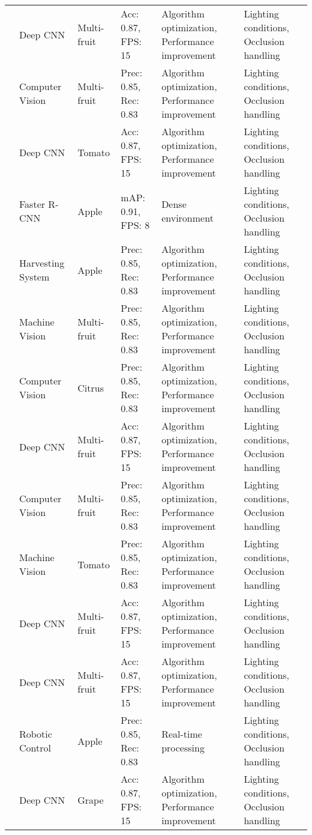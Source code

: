 \begin{table*}[htbp]
\begin{tabular}{@{}p{}p{}p{}p{}p{}p{}@{}}
\cite{robot2022} & Deep CNN & Multi-fruit & Acc: 0.87, FPS: 15 & Algorithm optimization, Performance improvement & Lighting conditions, Occlusion handling \\
\cite{vision2019} & Computer Vision & Multi-fruit & Prec: 0.85, Rec: 0.83 & Algorithm optimization, Performance improvement & Lighting conditions, Occlusion handling \\
\cite{robot2018} & Deep CNN & Tomato & Acc: 0.87, FPS: 15 & Algorithm optimization, Performance improvement & Lighting conditions, Occlusion handling \\
\cite{wan2020faster} & Faster R-CNN & Apple & mAP: 0.91, FPS: 8 & Dense environment & Lighting conditions, Occlusion handling \\
\cite{jia2020apple} & Harvesting System & Apple & Prec: 0.85, Rec: 0.83 & Algorithm optimization, Performance improvement & Lighting conditions, Occlusion handling \\
\cite{harvest2016} & Machine Vision & Multi-fruit & Prec: 0.85, Rec: 0.83 & Algorithm optimization, Performance improvement & Lighting conditions, Occlusion handling \\
\cite{mehta2016robust} & Computer Vision & Citrus & Prec: 0.85, Rec: 0.83 & Algorithm optimization, Performance improvement & Lighting conditions, Occlusion handling \\
\cite{harvest2018} & Deep CNN & Multi-fruit & Acc: 0.87, FPS: 15 & Algorithm optimization, Performance improvement & Lighting conditions, Occlusion handling \\
\cite{robot2018} & Computer Vision & Multi-fruit & Prec: 0.85, Rec: 0.83 & Algorithm optimization, Performance improvement & Lighting conditions, Occlusion handling \\
\cite{harvest2020} & Machine Vision & Tomato & Prec: 0.85, Rec: 0.83 & Algorithm optimization, Performance improvement & Lighting conditions, Occlusion handling \\
\cite{harvest2021} & Deep CNN & Multi-fruit & Acc: 0.87, FPS: 15 & Algorithm optimization, Performance improvement & Lighting conditions, Occlusion handling \\
\cite{harvest2022} & Deep CNN & Multi-fruit & Acc: 0.87, FPS: 15 & Algorithm optimization, Performance improvement & Lighting conditions, Occlusion handling \\
\cite{liu2020yolo} & Robotic Control & Apple & Prec: 0.85, Rec: 0.83 & Real-time processing & Lighting conditions, Occlusion handling \\
\cite{harvest2017} & Deep CNN & Grape & Acc: 0.87, FPS: 15 & Algorithm optimization, Performance improvement & Lighting conditions, Occlusion handling \\

\end{tabular}
\end{table*}
